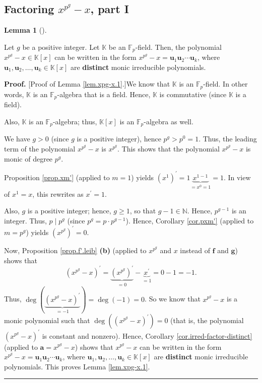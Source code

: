 \documentclass[numbers=enddot,12pt,final,onecolumn,notitlepage]{scrartcl}%
\theoremstyle{definition}
\newtheorem{lem}[theo]{Lemma}
\newenvironment{lemma}[1][]
{\begin{lem}[#1]\begin{leftbar}}
{\end{leftbar}\end{lem}}
\newenvironment{proof}[1][Proof]{\noindent\textbf{#1.} }{\ \rule{0.5em}{0.5em}}
\newenvironment{noncompile}{}{}
\begin{document}
\subsection{Factoring $x^{p^{g}}-x$, part I}

\begin{lemma}
\label{lem.xpg-x.1}Let $g$ be a positive integer. Let $\mathbb{K}$ be an
$\mathbb{F}_{p}$-field. Then, the polynomial $x^{p^{g}}-x\in\mathbb{K}\left[
x\right]  $ can be written in the form $x^{p^{g}}-x=\mathbf{u}_{1}%
\mathbf{u}_{2}\cdots\mathbf{u}_{k}$, where $\mathbf{u}_{1},\mathbf{u}%
_{2},\ldots,\mathbf{u}_{k}\in\mathbb{K}\left[  x\right]  $ are
\textbf{distinct} monic irreducible polynomials.
\end{lemma}

\begin{proof}
[Proof of Lemma \ref{lem.xpg-x.1}.]We know that $\mathbb{K}$ is an
$\mathbb{F}_{p}$-field. In other words, $\mathbb{K}$ is an $\mathbb{F}_{p}%
$-algebra that is a field. Hence, $\mathbb{K}$ is commutative (since
$\mathbb{K}$ is a field).

\begin{noncompile}
Also, $\mathbb{K}$ is an $\mathbb{F}_{p}$-algebra; thus, $\mathbb{K}\left[
x\right]  $ is an $\mathbb{F}_{p}$-algebra as well.
\end{noncompile}

We have $g>0$ (since $g$ is a positive integer), hence $p^{g}>p^{0}=1$. Thus,
the leading term of the polynomial $x^{p^{g}}-x$ is $x^{p^{g}}$. This shows
that the polynomial $x^{p^{g}}-x$ is monic of degree $p^{g}$.

Proposition \ref{prop.xm'} (applied to $m=1$) yields $\left(  x^{1}\right)
^{\prime}=1\underbrace{x^{1-1}}_{=x^{0}=1}=1$. In view of $x^{1}=x$, this
rewrites as $x^{\prime}=1$.

Also, $g$ is a positive integer; hence, $g\geq1$, so that $g-1\in\mathbb{N}$.
Hence, $p^{g-1}$ is an integer. Thus, $p\mid p^{g}$ (since $p^{g}=p\cdot
p^{g-1}$). Hence, Corollary \ref{cor.pxm'} (applied to $m=p^{g}$) yields
$\left(  x^{p^{g}}\right)  ^{\prime}=0$.

Now, Proposition \ref{prop.f'.leib} \textbf{(b)} (applied to $x^{p^{g}}$ and
$x$ instead of $\mathbf{f}$ and $\mathbf{g}$) shows that
\[
\left(  x^{p^{g}}-x\right)  ^{\prime}=\underbrace{\left(  x^{p^{g}}\right)
^{\prime}}_{=0}-\underbrace{x^{\prime}}_{=1}=0-1=-1.
\]
Thus, $\deg\left(  \underbrace{\left(  x^{p^{g}}-x\right)  ^{\prime}}%
_{=-1}\right)  =\deg\left(  -1\right)  =0$. So we know that $x^{p^{g}}-x$ is a
monic polynomial such that $\deg\left(  \left(  x^{p^{g}}-x\right)  ^{\prime
}\right)  =0$ (that is, the polynomial $\left(  x^{p^{g}}-x\right)  ^{\prime}$
is constant and nonzero). Hence, Corollary \ref{cor.irred-factor-distinct}
(applied to $\mathbf{a}=x^{p^{g}}-x$) shows that $x^{p^{g}}-x$ can be written
in the form $x^{p^{g}}-x=\mathbf{u}_{1}\mathbf{u}_{2}\cdots\mathbf{u}_{k}$,
where $\mathbf{u}_{1},\mathbf{u}_{2},\ldots,\mathbf{u}_{k}\in\mathbb{K}\left[
x\right]  $ are \textbf{distinct} monic irreducible polynomials. This proves
Lemma \ref{lem.xpg-x.1}.
\end{proof}
\end{document}
